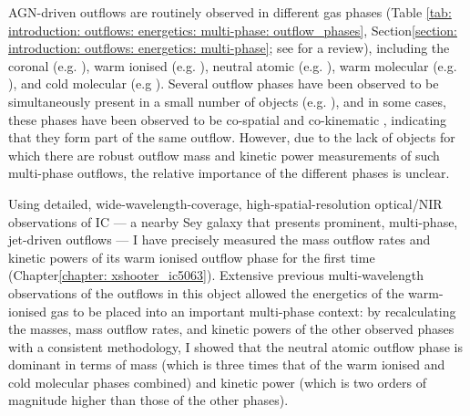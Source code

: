 AGN-driven outflows are routinely observed in different gas phases (Table \ref{tab: introduction: outflows: energetics: multi-phase: outflow_phases}, Section\;\ref{section: introduction: outflows: energetics: multi-phase}; see \citealt{Cicone2018} for a review), including the coronal (e.g. \citealt{Riffel2013b, Speranza2022, VillarMartin2023, FonsecaFaria2023}), warm ionised (e.g. \citealt{VillarMartin1999, Holt2003, Zaurin2013, Harrison2014, Rose2018, Tadhunter2019, Revalski2021}), neutral atomic (e.g. \citealt{Morganti1998, Oosterloo2000, Rupke2005, Schulz2018, Su2023}), warm molecular (e.g. \citealt{Tadhunter2014, May2017}), and cold molecular (e.g \citealt{Alatalo2011, Cicone2014, Morganti2015, Oosterloo2017, RamosAlmeida2022, Audibert2023}). Several outflow phases have been observed to be simultaneously present in a small number of objects (e.g. \citealt{Morganti2005, Holt2011, Tadhunter2014, Riffel2015, Feruglio2015, Morganti2016, Finlez2018, Fluetsch2019}), and in some cases, these phases have been observed to be co-spatial and co-kinematic \citep{Morganti2007, Morganti2013_4c1250, Morganti2015, Tadhunter2014, Oosterloo2017, Rose2018}, indicating that they form part of the same outflow. However, due to the lack of objects for which there are robust outflow mass and kinetic power measurements of such multi-phase outflows, the relative importance of the different phases is unclear.

Using detailed, wide-wavelength-coverage, high-spatial-resolution optical/NIR observations of IC --- a nearby Sey galaxy that presents prominent, multi-phase, jet-driven outflows --- I have precisely measured the mass outflow rates and kinetic powers of its warm ionised outflow phase for the first time (Chapter\;\ref{chapter: xshooter_ic5063}). Extensive previous multi-wavelength observations of the outflows in this object \citep{Morganti2005, Oosterloo2017, Venturi2021} allowed the energetics of the warm-ionised gas to be placed into an important multi-phase context: by recalculating the masses, mass outflow rates, and kinetic powers of the other observed phases with a consistent methodology, I showed that the neutral atomic outflow phase is dominant in terms of mass (which is three times that of the warm ionised and cold molecular phases combined) and kinetic power (which is two orders of magnitude higher than those of the other phases).

